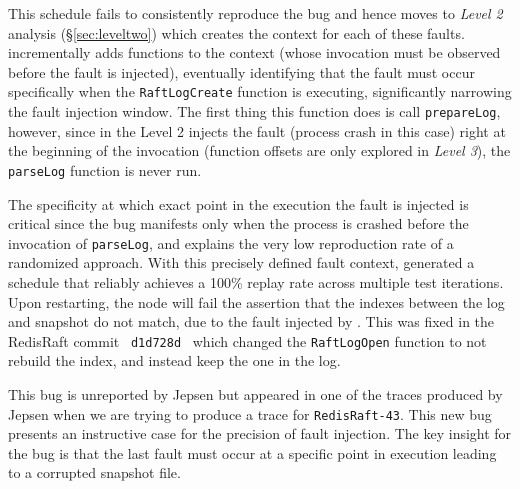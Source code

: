 This schedule fails to consistently reproduce the bug and hence \sys moves to \emph{Level 2} analysis (\S\ref{sec:leveltwo}) which creates the context for each of these faults.
\sys incrementally adds functions to the context (whose invocation must be observed before the fault is injected), eventually identifying that the fault must occur specifically when the \texttt{RaftLogCreate} function is executing, significantly narrowing the fault injection window.
The first thing this function does is call \texttt{prepareLog}, however, since in the Level 2 \sys injects the fault (process crash in this case) right at the beginning of the invocation (function offsets are only explored in \emph{Level 3}), the \texttt{parseLog} function is never run.

The specificity at which exact point in the execution the fault is injected is critical since the bug manifests only when the process is crashed before the invocation of \texttt{parseLog}, and explains the very low reproduction rate of a randomized approach.
With this precisely defined fault context, \sys generated a schedule that reliably achieves a 100\% replay rate across multiple test iterations.
Upon restarting, the node will fail the assertion that the indexes between the log and snapshot do not match, due to the fault injected by \sys.
This was fixed in the RedisRaft commit ~\texttt{d1d728d}~\cite{redisraftd1d728d} which changed the \texttt{RaftLogOpen} function to not rebuild the index, and instead keep the one in the log.


This bug is unreported by Jepsen but appeared in one of the traces produced by Jepsen when we are trying to produce a trace for \texttt{RedisRaft-43}.
This new bug presents an instructive case for the precision of fault injection.
The key insight for the bug is that the last fault must occur at a specific point in execution leading to a corrupted snapshot file.

